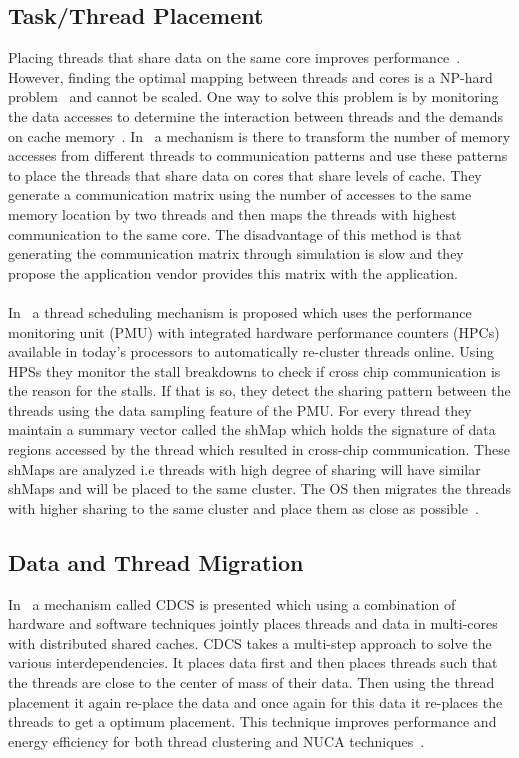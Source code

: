 \documentclass{listhesis}
\begin{document}
\subsection{Task/Thread Placement}
Placing threads that share data on the same core improves performance~\cite{threadPlacement1}. However, finding the optimal mapping between threads and cores is a NP-hard problem~\cite{threadPlacement2} and cannot be scaled. One way to solve this problem is by monitoring the data accesses to determine the interaction between threads and the demands on cache memory~\cite{threadPlacement3}. In~\cite{threadPlacement3} a mechanism is there to transform the number of memory accesses from different threads to communication patterns and use these patterns to place the threads that share data on cores that share levels of cache.  They generate a communication matrix using the number of accesses to the same memory location by two threads and then maps the threads with highest communication to the same core. The disadvantage of this method is that generating the communication matrix through simulation is slow and they propose the application vendor provides this matrix with the application.\\
\\
In~\cite{threadPlacement4} a thread scheduling mechanism is proposed which uses the performance monitoring unit (PMU) with integrated hardware performance counters (HPCs) available in today's processors to automatically re-cluster threads online. Using HPSs they monitor the stall breakdowns to check if cross chip communication is the reason for the stalls. If that is so, they detect the sharing pattern between the threads using the data sampling feature of the PMU.  For every thread they maintain a summary vector called the shMap  which holds the signature of data regions accessed by the thread which resulted in cross-chip communication. These shMaps are analyzed i.e threads with high degree of sharing will have similar shMaps and will be placed to the same cluster. The OS then migrates the threads with higher sharing to the same cluster and place them as close as possible~\cite{threadPlacement4}.\\
\subsection{Data and Thread Migration}
In~\cite{datathreadPlacement} a mechanism called CDCS is presented which using a combination of hardware and software techniques jointly places threads and data in multi-cores with distributed shared caches. CDCS takes a multi-step approach to solve the various interdependencies. It places data first and then places threads such that the threads are close to the center of mass of their data. Then using the thread placement it again re-place the data and once again for this data it re-places the threads to get a optimum placement. This technique improves performance and energy efficiency for both thread clustering and NUCA techniques~\cite{datathreadPlacement}.\\
\end{document}
